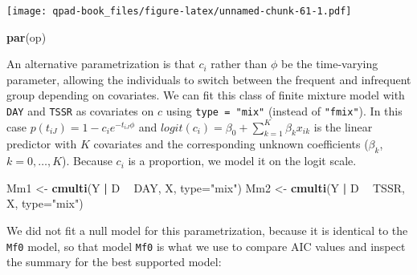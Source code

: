 \documentclass[12pt,]{book}
\newenvironment{Shaded}{\begin{snugshade}}{\end{snugshade}}
\newcommand{\DataTypeTok}[1]{\textcolor[rgb]{0.13,0.29,0.53}{#1}}
\newcommand{\DecValTok}[1]{\textcolor[rgb]{0.00,0.00,0.81}{#1}}
\newcommand{\KeywordTok}[1]{\textcolor[rgb]{0.13,0.29,0.53}{\textbf{#1}}}
\newcommand{\NormalTok}[1]{#1}
\newcommand{\OperatorTok}[1]{\textcolor[rgb]{0.81,0.36,0.00}{\textbf{#1}}}
\newcommand{\StringTok}[1]{\textcolor[rgb]{0.31,0.60,0.02}{#1}}
\begin{document}
\texttt{[image: qpad-book\_files/figure-latex/unnamed-chunk-61-1.pdf]}

\begin{Shaded}
\begin{Highlighting}[]
\KeywordTok{par}\NormalTok{(op)}
\end{Highlighting}
\end{Shaded}

An alternative parametrization is that \(c_{i}\) rather than \(\phi\) be the time-varying parameter,
allowing the individuals to switch between the frequent and infrequent group depending on covariates.
We can fit this class of finite mixture model with \texttt{DAY} and \texttt{TSSR} as covariates on \(c\)
using \texttt{type\ =\ "mix"} (instead of \texttt{"fmix"}).
In this case \(p(t_{iJ}) = 1 - c_{i} e^{-t_{iJ} \phi}\) and
\(logit(c_{i}) = \beta_{0} + \sum^{K}_{k=1} \beta_{k} x_{ik}\) is the linear predictor with \(K\)
covariates and the corresponding unknown coefficients (\(\beta_{k}\), \(k = 0,\ldots, K\)).
Because \(c_{i}\) is a proportion, we model it on the logit scale.

\begin{Shaded}
\begin{Highlighting}[]
\NormalTok{Mm1 <-}\StringTok{ }\KeywordTok{cmulti}\NormalTok{(Y }\OperatorTok{|}\StringTok{ }\NormalTok{D }\OperatorTok{~}\StringTok{ }\NormalTok{DAY, X, }\DataTypeTok{type=}\StringTok{"mix"}\NormalTok{)}
\NormalTok{Mm2 <-}\StringTok{ }\KeywordTok{cmulti}\NormalTok{(Y }\OperatorTok{|}\StringTok{ }\NormalTok{D }\OperatorTok{~}\StringTok{ }\NormalTok{TSSR, X, }\DataTypeTok{type=}\StringTok{"mix"}\NormalTok{)}
\end{Highlighting}
\end{Shaded}

We did not fit a null model for this parametrization, because it is identical to the \texttt{Mf0} model,
so that model \texttt{Mf0} is what we use to compare AIC values and inspect the summary for the best
supported model:

\begin{Shaded}
\end{Shaded}
\end{document}
